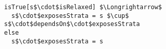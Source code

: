 \lstset{frame=tb, aboveskip=12pt, belowskip=-3pt, breaklines=true, basicstyle=\small\ttfamily, tabsize=2, mathescape=true}
\begin{lstlisting}[caption={facts.als, lines 21-24}, label=alloy:STRATUM_VISIBILITY, captionpos=b]
isTrue[s$\cdot$isRelaxed] $\Longrightarrow$
  s$\cdot$exposesStrata = s $\cup$ s$\cdot$dependsOn$\cdot$exposesStrata
else
  s$\cdot$exposesStrata = s
\end{lstlisting}